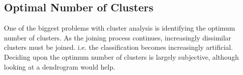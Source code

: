 \documentclass[a4paper,12pt]{article}
\begin{document}
\subsection{Optimal Number of Clusters}
One of the biggest problems with cluster analysis is identifying the optimum number of
clusters. As the joining process continues, increasingly dissimilar clusters must be joined. i.e. the classification becomes increasingly artificial. Deciding upon the optimum number
of clusters is largely subjective, although looking at a dendrogram would help.


\end{document}
